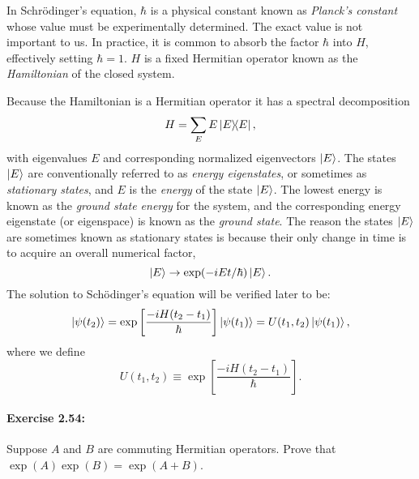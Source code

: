 In Schr{\"o}dinger's equation, $\hbar$ is a physical constant known
as \emph{Planck's constant} whose value must be experimentally determined. The
exact value is not important to us. In practice, it is common to absorb the
factor $\hbar$ into $H$, effectively setting $\hbar = 1$. $H$ is a fixed
Hermitian operator known as the \emph{Hamiltonian} of the closed system.

Because the Hamiltonian is a Hermitian operator it has a spectral decomposition
\begin{equation}
  H = \sum_E E\ketbra{E}{E}, \label{eq:ham-spec-dec}
\end{equation} with eigenvalues $E$ and corresponding normalized eigenvectors
$\ket{E}$. The states $\ket{E}$ are conventionally referred to as \emph{energy
eigenstates}, or sometimes as \emph{stationary states}, and $E$ is the
\emph{energy} of the state $\ket{E}$. The lowest energy is known as the
\emph{ground state energy} for the system, and the corresponding energy
eigenstate (or eigenspace) is known as the \emph{ground state}. The reason the
states $\ket{E}$ are sometimes known as stationary states is because their only
change in time is to acquire an overall numerical factor, \begin{equation*}
  \ket{E} \rightarrow \exp(-iEt/\hbar)\ket{E}.
\end{equation*}
The solution to Sch{\"o}dinger's equation will be verified later to be:
\begin{equation*} \ket{\psi(t_2)} = \exp\left[\frac{-iH(t_2 - t_1)}{\hbar}\right]
    \ket{\psi(t_1)} = U(t_1, t_2)\ket{\psi(t_1)},
\end{equation*} where we define \begin{equation}
  U(t_1, t_2) \equiv \exp\left[\frac{-iH(t_2 - t_1)}{\hbar}\right].
  \label{eq:unit-sch-eq}
\end{equation}

\paragraph{\cite{mikeandike} Exercise 2.54:} Suppose $A$ and $B$ are commuting
Hermitian operators. Prove that $\exp(A)\exp(B) = \exp(A + B)$.

